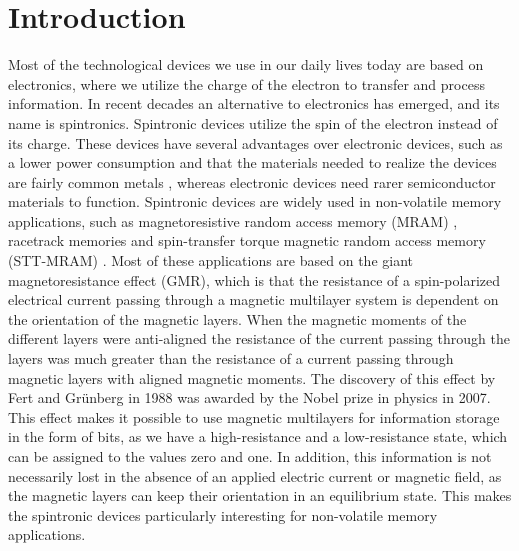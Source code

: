 \chapter{Introduction}
Most of the technological devices we use in our daily lives today are based on electronics, where we utilize the charge of the electron to transfer and process information. In recent decades an alternative to electronics has emerged, and its name is spintronics. Spintronic devices utilize the spin of the electron instead of its charge. These devices have several advantages over electronic devices, such as a lower power consumption and that the materials needed to realize the devices are fairly common metals \cite{Okamoto2014}, whereas electronic devices need rarer semiconductor materials to function. Spintronic devices are widely used in non-volatile memory applications, such as magnetoresistive random access memory (MRAM) \cite{Akerman2005,Katine2008}, racetrack memories \cite{Parkin2008} and spin-transfer torque magnetic random access memory (STT-MRAM) \cite{Kent2015}. Most of these applications are based on the giant magnetoresistance effect (GMR), which is that the resistance of a spin-polarized electrical current passing through a magnetic multilayer system is dependent on the orientation of the magnetic layers. When the magnetic moments of the different layers were anti-aligned the resistance of the current passing through the layers was much greater than the resistance of a current passing through magnetic layers with aligned magnetic moments. The discovery of this effect by Fert \cite{Fert1988} and Gr\"{u}nberg \cite{Grunberg1989} in 1988 was awarded by the Nobel prize in physics in 2007. This effect makes it possible to use magnetic multilayers for information storage in the form of bits, as we have a high-resistance and a low-resistance state, which can be assigned to the values zero and one. In addition, this information is not necessarily lost in the absence of an applied electric current or magnetic field, as the magnetic layers can keep their orientation in an equilibrium state. This makes the spintronic devices particularly interesting for non-volatile memory applications.

